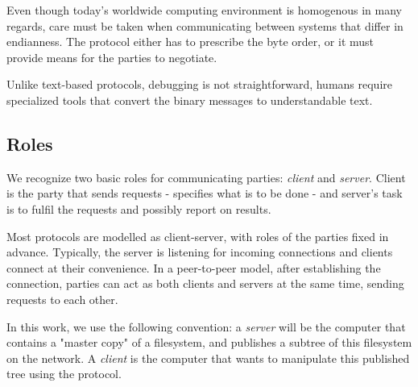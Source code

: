 Even though today's worldwide computing environment is homogenous in many regards, care must be taken when
communicating between systems that differ in endianness. The protocol either has to prescribe the byte order,
or it must provide means for the parties to negotiate.

Unlike text-based protocols, debugging is not straightforward, humans require specialized tools that convert
the binary messages to understandable text.


\subsection{Roles}

We recognize two basic roles for communicating parties: {\it client} and {\it server}. Client is the party
that sends requests - specifies what is to be done - and server's task is to fulfil the requests and possibly
report on results.

Most protocols are modelled as client-server, with roles of the parties fixed in advance. Typically, the
server is listening for incoming connections and clients connect at their convenience. In a peer-to-peer
model, after establishing the connection, parties can act as both clients and servers at the same time,
sending requests to each other.

In this work, we use the following convention: a {\it server} will be the computer that contains a "master
copy" of a filesystem, and publishes a subtree of this filesystem on the network. A {\it client} is the
computer that wants to manipulate this published tree using the protocol. 




